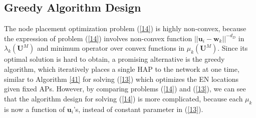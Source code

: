 \documentclass[journal, draftcls, one column, 12pt]{IEEEtran}
\begin{document}
\subsection{Greedy Algorithm Design}
The node placement optimization problem (\ref{14}) is highly non-convex, because the expression of problem (\ref{14}) involves non-convex function $||\mathbf{u}_i -\mathbf{w}_k||^{-d_D}$ in $\lambda_k\left(\mathbf{U}^M\right)$ and minimum operator over convex functions in $\mu_k\left(\mathbf{U}^M\right)$. Since its optimal solution is hard to obtain, a promising alternative is the greedy algorithm, which iteratively places a single HAP to the network at one time, similar to Algorithm \ref{41} for solving (\ref{13}) which optimizes the EN locations given fixed APs. However, by comparing problems (\ref{14}) and (\ref{13}), we can see that the algorithm design for solving (\ref{14}) is more complicated, because each $\mu_k$ is now a function of $\mathbf{u}_i$'s, instead of constant parameter in (\ref{13}).
\end{document}
